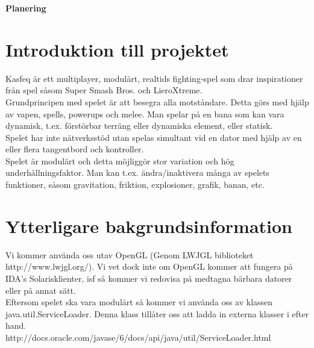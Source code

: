 \begin{center}
   \textbf{\Huge Planering}\\[1cm]
\end{center}
\section{Introduktion till projektet}
Kasfeq är ett multiplayer, modulärt, realtids fighting-spel som drar inspirationer från spel såsom Super Smash Bros. och LieroXtreme.\\
Grundprincipen med spelet är att besegra alla motståndare. Detta görs med hjälp av vapen, spells, powerups och melee. Man spelar på en bana som kan vara dynamisk, t.ex. förstörbar terräng eller dynamiska element, eller statisk.\\
\vspace{11pt}
Spelet har inte nätverksstöd utan spelas simultant vid en dator med hjälp av en eller flera tangentbord och kontroller.\\
\vspace{11pt}
Spelet är modulärt och detta möjliggör stor variation och hög underhållningsfaktor. Man kan t.ex. ändra/inaktivera många av spelets funktioner, såsom gravitation, friktion, explosioner, grafik, banan, etc.\\

\section{Ytterligare bakgrundsinformation}
Vi kommer använda oss utav OpenGL (Genom LWJGL biblioteket http://www.lwjgl.org/). Vi vet dock inte om OpenGL kommer att fungera på IDA's Solarisklienter, isf så kommer vi redovisa på medtagna bärbara datorer eller på annat sätt.\\
\vspace{11pt}
Eftersom spelet ska vara modulärt så kommer vi använda oss av klassen java.util.ServiceLoader. Denna klass tillåter oss att ladda in externa klasser i efter hand.\\
\vspace{11pt}
http://docs.oracle.com/javase/6/docs/api/java/util/ServiceLoader.html
